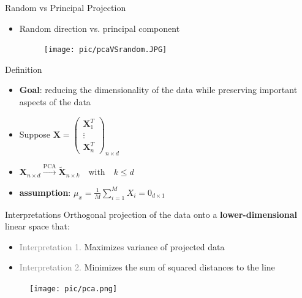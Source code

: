 \documentclass[serif, aspectratio=169]{beamer}
\begin{document}
\begin{frame}{Random vs Principal Projection}
    \begin{itemize}
        \item Random direction vs. principal component
        \begin{figure}[htpb]
            \begin{center}
                \texttt{[image: pic/pcaVSrandom.JPG]}
            \end{center}
        \end{figure}
    \end{itemize}
\end{frame}


\begin{frame}{Definition}
    \begin{itemize}
        \item \textbf{Goal}: reducing the dimensionality of the data while preserving important aspects of the data
        \item Suppose $\mathbf{X} = \begin{pmatrix} \mathbf{X}_1^T \\ \vdots \\ \mathbf{X}_n^T \end{pmatrix}_{n \times d}$
        \item $\mathbf{X}_{n \times d} \xrightarrow{\text{PCA}} \tilde{\mathbf{X}}_{n \times k} \quad \text{with} \quad k \leq d$
        \item \textbf{assumption}: $\mu_x = \frac{1}{M} \sum_{i=1}^{M}X_i = 0_{d \times 1}$
    \end{itemize}
\end{frame}

\begin{frame}{Interpretations}
    Orthogonal projection of the data onto a \textbf{lower-dimensional} linear space that:
    \begin{itemize}
        \item \textcolor{gray}{Interpretation 1.} Maximizes variance of projected data
        \item \textcolor{gray}{Interpretation 2.} Minimizes the sum of squared distances to the line
    \end{itemize}
    \begin{figure}[htpb]
        \begin{center}
            \texttt{[image: pic/pca.png]}
        \end{center}
    \end{figure}
\end{frame}
\end{document}
